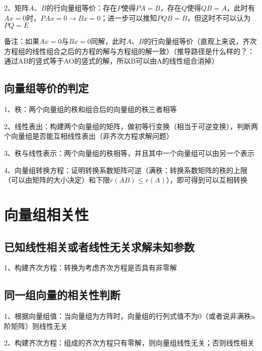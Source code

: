 2、矩阵$A、B$的行向量组等价：存在$P$使得$PA=B$，存在$Q$使得$QB=A$，此时有$Ax=0$时，$PAx=0 \rightarrow Bx=0$；进一步可以推知$PQB=B$，但这时不可以认为$PQ=E$

备注：如果$Ax=0$与$Bx=0$同解，此时$A、B$的行向量组等价（直观上来说，齐次方程组的线性组合之后的方程的解与方程组的解一致）（推导路径是什么样的？：通过AB的竖式等于AO的竖式的解，所以B可以由A的线性组合消掉）



\subsection{向量组等价的判定}

1、秩：两个向量组的秩和组合后的向量组的秩三者相等

2、线性表出：构建两个向量组的矩阵，做初等行变换（相当于可逆变换），判断两个向量组是否能互相线性表出（非齐次方程求解问题）

3、秩与线性表示：两个向量组的秩相等，并且其中一个向量组可以由另一个表示 

4、向量组转换方程：证明转换系数矩阵可逆（满秩：转换系数矩阵的秩的上限（可以由矩阵的大小决定）和下限$r(AB) \le r(A)$），即可得到可以互相转换

\section{向量组相关性}



\subsection{已知线性相关或者线性无关求解未知参数}

1、构建齐次方程：转换为考虑齐次方程是否具有非零解



\subsection{同一组向量的相关性判断}

1、根据向量组值：当向量组为方阵时，向量组的行列式值不为0（或者说非满秩n阶矩阵）则线性无关

2、构建齐次方程：组成的齐次方程只有零解，则向量组线性无关；否则线性相关



